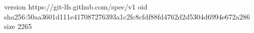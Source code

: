 version https://git-lfs.github.com/spec/v1
oid sha256:50aa3601d111e417087276393a1c2fc8cfdf88fd4762d2d5304d6994e672a286
size 2265
